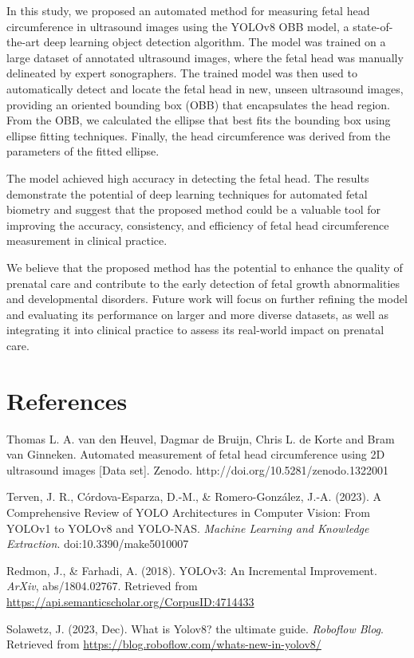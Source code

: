 \documentclass[14pt]{extreport}
\begin{document}
In this study, we proposed an automated method for measuring fetal head circumference in ultrasound images using the YOLOv8 OBB model, a state-of-the-art deep learning object detection algorithm. The model was trained on a large dataset of annotated ultrasound images, where the fetal head was manually delineated by expert sonographers. The trained model was then used to automatically detect and locate the fetal head in new, unseen ultrasound images, providing an oriented bounding box (OBB) that encapsulates the head region. From the OBB, we calculated the ellipse that best fits the bounding box using ellipse fitting techniques. Finally, the head circumference was derived from the parameters of the fitted ellipse.

The model achieved high accuracy in detecting the fetal head. The results demonstrate the potential of deep learning techniques for automated fetal biometry and suggest that the proposed method could be a valuable tool for improving the accuracy, consistency, and efficiency of fetal head circumference measurement in clinical practice.

We believe that the proposed method has the potential to enhance the quality of prenatal care and contribute to the early detection of fetal growth abnormalities and developmental disorders. Future work will focus on further refining the model and evaluating its performance on larger and more diverse datasets, as well as integrating it into clinical practice to assess its real-world impact on prenatal care.

\clearpage
\chapter{References}
\begingroup
\renewcommand{\chapter}[2]{}
\begin{thebibliography}{}

    Thomas L. A. van den Heuvel, Dagmar de Bruijn, Chris L. de Korte and Bram van Ginneken. Automated measurement of fetal head circumference using 2D ultrasound images [Data set]. Zenodo. http://doi.org/10.5281/zenodo.1322001

    Terven, J. R., Córdova-Esparza, D.-M., \& Romero-González, J.-A. (2023). A Comprehensive Review of YOLO Architectures in Computer Vision: From YOLOv1 to YOLOv8 and YOLO-NAS. \textit{Machine Learning and Knowledge Extraction}. doi:10.3390/make5010007

    Redmon, J., \& Farhadi, A. (2018). YOLOv3: An Incremental Improvement. \textit{ArXiv}, abs/1804.02767. Retrieved from \url{https://api.semanticscholar.org/CorpusID:4714433}

    Solawetz, J. (2023, Dec). What is Yolov8? the ultimate guide. \textit{Roboflow Blog}. Retrieved from \url{https://blog.roboflow.com/whats-new-in-yolov8/}
\end{thebibliography}
\end{document}
